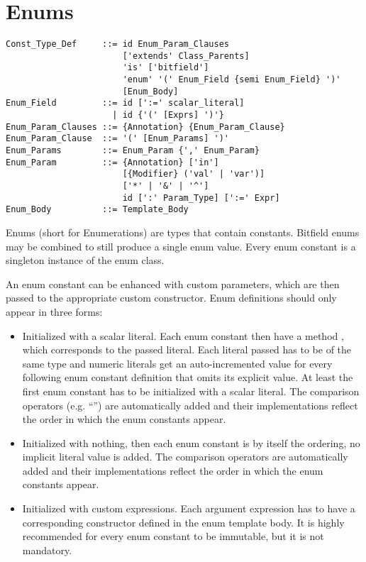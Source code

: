 \section{Enums}
\label{sec:enums}

\syntax\begin{lstlisting}
Const_Type_Def     ::= id Enum_Param_Clauses
                       ['extends' Class_Parents] 
                       'is' ['bitfield'] 
                       'enum' '(' Enum_Field {semi Enum_Field} ')'
                       [Enum_Body]
Enum_Field         ::= id [':=' scalar_literal]
                     | id {'(' [Exprs] ')'}
Enum_Param_Clauses ::= {Annotation} {Enum_Param_Clause}
Enum_Param_Clause  ::= '(' [Enum_Params] ')'
Enum_Params        ::= Enum_Param {',' Enum_Param}
Enum_Param         ::= {Annotation} ['in']
                       [{Modifier} ('val' | 'var')]
                       ['*' | '&' | '^']
                       id [':' Param_Type] [':=' Expr]
Enum_Body          ::= Template_Body
\end{lstlisting}

Enums (short for Enumerations) are types that contain constants. Bitfield enums may be combined to still produce a single enum value. Every enum constant is a singleton instance of the enum class. 

An enum constant can be enhanced with custom parameters, which are then passed to the appropriate custom constructor. Enum definitions should only appear in three forms: 
\begin{itemize}
  \item Initialized with a scalar literal. Each enum constant then have a method , which corresponds to the passed literal. Each literal passed has to be of the same type and numeric literals get an auto-incremented value for every following enum constant definition that omits its explicit value. At least the first enum constant has to be initialized with a scalar literal. The comparison operators (e.g. ``\code{<}'') are automatically added and their implementations reflect the order in which the enum constants appear. 
  \item Initialized with nothing, then each enum constant is by itself the ordering, no implicit literal value is added. The comparison operators are automatically added and their implementations reflect the order in which the enum constants appear. 
  \item Initialized with custom expressions. Each argument expression has to have a corresponding constructor defined in the enum template body. It is highly recommended for every enum constant to be immutable, but it is not mandatory. 
\end{itemize}






